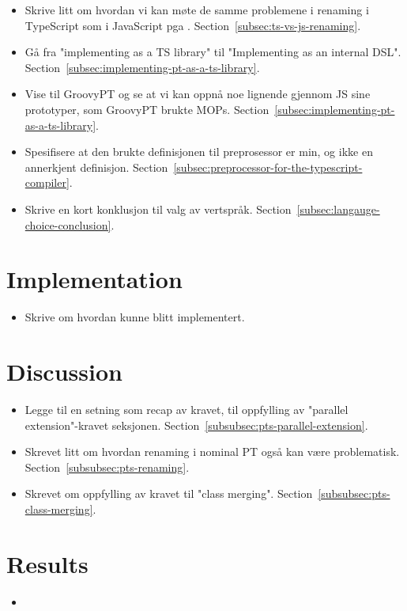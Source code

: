 \begin{itemize}
    \item Skrive litt om hvordan vi kan møte de samme problemene i renaming i TypeScript som i JavaScript pga .
    Section~\vref{subsec:ts-vs-js-renaming}.
    \item Gå fra "implementing as a TS library" til "Implementing as an internal DSL".
    Section~\vref{subsec:implementing-pt-as-a-ts-library}.
    \item Vise til GroovyPT og se at vi kan oppnå noe lignende gjennom JS sine prototyper, som GroovyPT brukte MOPs.
    Section~\vref{subsec:implementing-pt-as-a-ts-library}.
    \item Spesifisere at den brukte definisjonen til preprosessor er min, og ikke en annerkjent definisjon.
    Section~\vref{subsec:preprocessor-for-the-typescript-compiler}.
    \item Skrive en kort konklusjon til valg av vertspråk.
    Section~\vref{subsec:langauge-choice-conclusion}.
\end{itemize}

\section*{Implementation}

\begin{itemize}
    \item Skrive om hvordan  kunne blitt implementert.
\end{itemize}

\section*{Discussion}

\begin{itemize}
    \item Legge til en setning som recap av kravet, til oppfylling av "parallel extension"-kravet seksjonen.
    Section~\vref{subsubsec:pts-parallel-extension}.
    \item Skrevet litt om hvordan renaming i nominal PT også kan være problematisk.
    Section~\vref{subsubsec:pts-renaming}.
    \item Skrevet om oppfylling av kravet til "class merging".
    Section~\vref{subsubsec:pts-class-merging}.
\end{itemize}

\section*{Results}

\begin{itemize}
    \item
\end{itemize}
